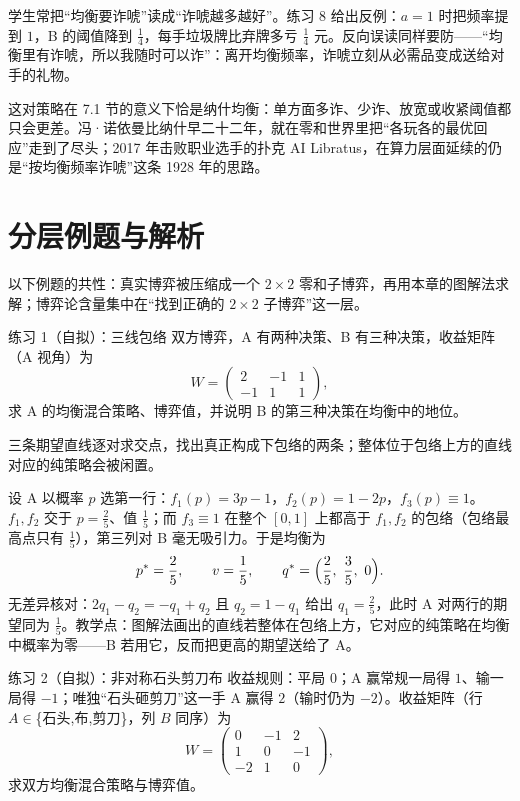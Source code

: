 \begin{pitfall}[诈唬不是越多越好]
学生常把“均衡要诈唬”读成“诈唬越多越好”。练习 8 给出反例：$a=1$ 时把频率提到 $1$，B 的阈值降到 $\tfrac14$，每手垃圾牌比弃牌多亏 $\tfrac14$ 元。反向误读同样要防——“均衡里有诈唬，所以我随时可以诈”：离开均衡频率，诈唬立刻从必需品变成送给对手的礼物。
\end{pitfall}

这对策略在 7.1 节的意义下恰是纳什均衡：单方面多诈、少诈、放宽或收紧阈值都只会更差。冯·诺依曼比纳什早二十二年，就在零和世界里把“各玩各的最优回应”走到了尽头；2017 年击败职业选手的扑克 AI Libratus，在算力层面延续的仍是“按均衡频率诈唬”这条 1928 年的思路。

\section{分层例题与解析}

以下例题的共性：真实博弈被压缩成一个 $2\times2$ 零和子博弈，再用本章的图解法求解；博弈论含量集中在“找到正确的 $2\times2$ 子博弈”这一层。


\begin{problem}{练习 1（自拟）：三线包络}
双方博弈，A 有两种决策、B 有三种决策，收益矩阵（A 视角）为
\[
 W=\begin{pmatrix}2&-1&1\\-1&1&1\end{pmatrix},
\]
求 A 的均衡混合策略、博弈值，并说明 B 的第三种决策在均衡中的地位。
\end{problem}

\hint 三条期望直线逐对求交点，找出真正构成下包络的两条；整体位于包络上方的直线对应的纯策略会被闲置。

\sol 设 A 以概率 $p$ 选第一行：$f_1(p)=3p-1$，$f_2(p)=1-2p$，$f_3(p)\equiv1$。$f_1,f_2$ 交于 $p=\tfrac25$、值 $\tfrac15$；而 $f_3\equiv1$ 在整个 $[0,1]$ 上都高于 $f_1,f_2$ 的包络（包络最高点只有 $\tfrac15$），第三列对 B 毫无吸引力。于是均衡为
\[
 p^{*}=\frac25,\qquad v=\frac15,\qquad q^{*}=\Bigl(\frac25,\ \frac35,\ 0\Bigr).
\]
无差异核对：$2q_1-q_2=-q_1+q_2$ 且 $q_2=1-q_1$ 给出 $q_1=\tfrac25$，此时 A 对两行的期望同为 $\tfrac15$。教学点：图解法画出的直线若整体在包络上方，它对应的纯策略在均衡中概率为零——B 若用它，反而把更高的期望送给了 A。

\begin{problem}{练习 2（自拟）：非对称石头剪刀布}
收益规则：平局 $0$；A 赢常规一局得 $1$、输一局得 $-1$；唯独“石头砸剪刀”这一手 A 赢得 $2$（输时仍为 $-2$）。收益矩阵（行 $A\in$\{石头,布,剪刀\}，列 $B$ 同序）为
\[
 W=\begin{pmatrix}0&-1&2\\1&0&-1\\-2&1&0\end{pmatrix},
\]
求双方均衡混合策略与博弈值。
\end{problem}

